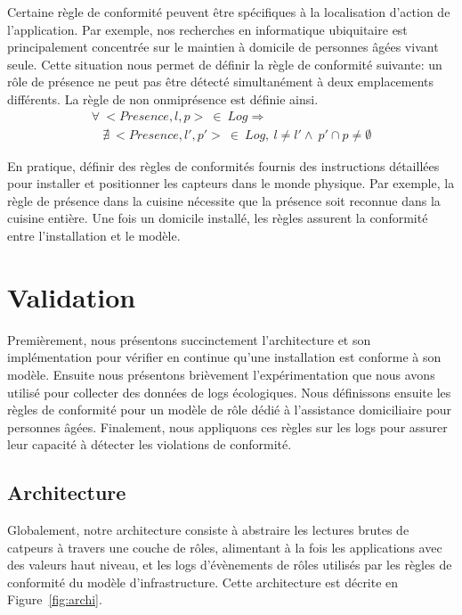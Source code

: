 Certaine règle de conformité peuvent être spécifiques à la localisation d'action de l'application. Par exemple, nos recherches en informatique ubiquitaire est principalement concentrée sur le maintien à domicile de personnes âgées vivant seule. Cette situation nous permet de définir la règle de conformité suivante: un rôle de présence ne peut pas être détecté simultanément à deux emplacements différents. La règle de non onmiprésence est définie ainsi. 
\begin{displaymath}\label{archi:algebra:example3}
  \begin{array}{c}
    \forall~<Presence, l, p>~\in~Log \Rightarrow \\
     ~~~~\nexists~ <Presence, l', p'>~\in~Log,~l \neq l' \wedge ~p' \cap p \neq \emptyset
  \end{array}
\end{displaymath}

En pratique, définir des règles de conformités fournis des instructions détaillées pour installer et positionner les capteurs dans le monde physique. Par exemple, la règle de présence dans la cuisine nécessite que la présence soit reconnue dans la cuisine entière. Une fois un domicile installé, les règles assurent la conformité entre l'installation et le modèle.
\section{Validation}



Premièrement, nous présentons succinctement l'architecture et son implémentation pour vérifier en continue qu'une installation est conforme à son modèle. Ensuite nous présentons brièvement l'expérimentation que nous avons utilisé pour collecter des données de logs écologiques. Nous définissons ensuite les règles de conformité pour un modèle de rôle dédié à l'assistance domiciliaire pour personnes âgées. Finalement, nous appliquons ces règles sur les logs pour assurer leur capacité à détecter les violations de conformité.

\subsection{Architecture}
Globalement, notre architecture consiste à abstraire les lectures brutes de catpeurs à travers une couche de rôles, alimentant à la fois les applications avec des valeurs haut niveau, et les logs d'évènements de rôles utilisés par les règles de conformité du modèle d'infrastructure. Cette architecture est décrite en Figure~\ref{fig:archi}.

